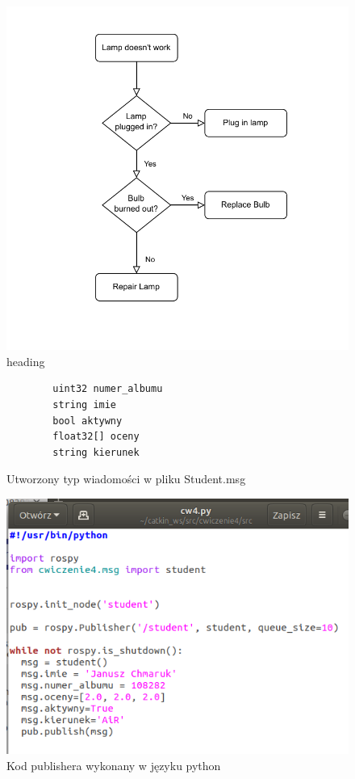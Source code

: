 \documentclass[10pt,a4paper,twoside,twocolumn]{article}%
\begin{document}
\begin{figure}[H]
    \centering
    \includegraphics[width=1\linewidth]{1234.pdf}
    \caption{heading}
\end{figure}


\begin{figure}[H]
    \centering
    \begin{verbatim}
        uint32 numer_albumu
        string imie
        bool aktywny
        float32[] oceny
        string kierunek
    \end{verbatim}
    \caption{Utworzony typ wiadomości w pliku Student.msg}
\end{figure}


%
\begin{figure}[H]
    \centering
    \includegraphics[width=0.8\linewidth]{cw4_py.png}
    \caption{Kod publishera wykonany w języku python}
\end{figure}
\end{document}
